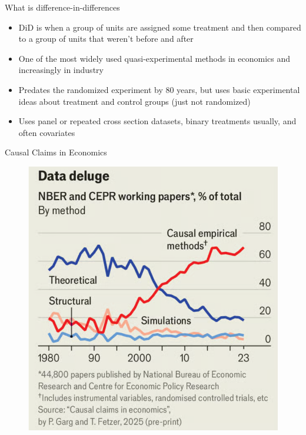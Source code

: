 \documentclass{beamer}
\begin{document}
\begin{frame}{What is difference-in-differences}

\begin{itemize}
\item DiD is when a group of units are assigned some treatment and then compared to a group of units that weren't before and after
\item One of the most widely used quasi-experimental methods in economics and increasingly in industry
\item Predates the randomized experiment by 80 years, but uses basic experimental ideas about treatment and control groups (just not randomized)
\item Uses panel or repeated cross section datasets, binary treatments usually, and often covariates
\end{itemize}
\end{frame}


\begin{frame}{Causal Claims in Economics}

	\begin{figure}
	\includegraphics[scale=0.4]{./lecture_includes/causal_claims}
	\end{figure}

\end{frame}
\end{document}
